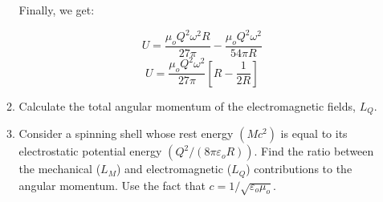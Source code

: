 \begin{enumerate}
\begin{enumerate}
        Finally, we get:

        $$U=\frac{\mu_oQ^2\omega^2R}{27\pi}-\frac{\mu_oQ^2\omega^2}{54\pi R}$$
        $$\boxed{U=\frac{\mu_oQ^2\omega^2}{27\pi}\left[R-\frac{1}{2R}\right]}$$

      \item Calculate the total angular momentum of the electromagnetic fields, $L_Q$.

      \item Consider a spinning shell whose rest energy $(Mc^2)$ is equal to its electrostatic potential energy $(Q^2/(8\pi\varepsilon_o R))$. Find the ratio between the mechanical ($L_M$) and electromagnetic ($L_Q$) contributions to the angular momentum. Use the fact that $c=1/\sqrt{\varepsilon_o\mu_o}$.

    \end{enumerate}

\end{enumerate}




